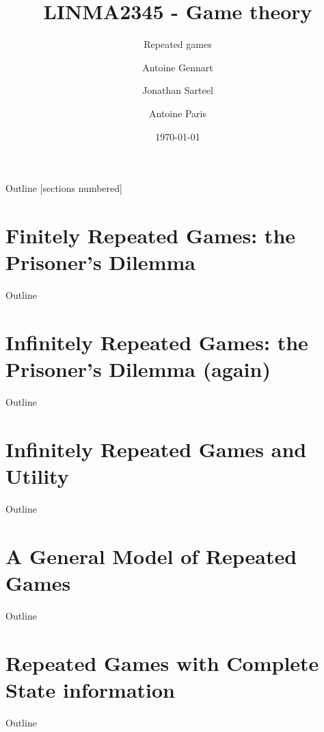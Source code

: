 \documentclass[10pt]{beamer}
\title{LINMA2345 - Game theory}
\subtitle{Repeated games}
\date{\today}
\author{Antoine Gennart\and Jonathan Sarteel\and Antoine Paris}
\institute{Ecole polytechnique de Louvain}
\begin{document}
\maketitle


\begin{frame}{Outline}
    [sections numbered]
    \tableofcontents[hideallsubsections]
\end{frame}

\section{Finitely Repeated Games: the Prisoner's Dilemma}
\begin{frame}{Outline}
    \tableofcontents[currentsection]
\end{frame}



\section{Infinitely Repeated Games: the Prisoner's Dilemma (again)}
\begin{frame}{Outline}
    \tableofcontents[currentsection]
\end{frame}



\section{Infinitely Repeated Games and Utility}
\begin{frame}{Outline}
    \tableofcontents[currentsection]
\end{frame}



\section{A General Model of Repeated Games}
\begin{frame}{Outline}
    \tableofcontents[currentsection]
\end{frame}



\section{Repeated Games with Complete State information}
\begin{frame}{Outline}
    \tableofcontents[currentsection]
\end{frame}
\end{document}
